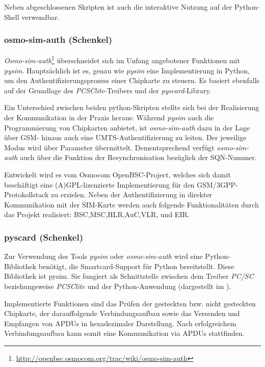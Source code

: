 Neben abgeschlossenen Skripten ist auch die interaktive Nutzung auf der
Python-Shell verwendbar.

\subsubsection{osmo-sim-auth (Schenkel)}
\label{subsec:osmosim}
\textit{Osmo-sim-auth}\footnote{\url{http://openbsc.osmocom.org/trac/wiki/osmo-sim-auth}}
überschneidet sich im Unfang angebotener Funktionen mit \textit{pysim}. Hauptsächlich ist es,
genau wie \textit{pysim} eine Implementierung in Python, um den Authentifizierungsprozess
einer Chipkarte zu steuern. Es basiert ebenfalls auf der Grundlage des
\textit{PCSClite}-Treibers und der \textit{pyscard}-Library.

Ein Unterschied zwischen beiden python-Skripten stellte sich bei der
Realisierung der Kommunikation in der Praxis heraus:
Während \textit{pysim} auch die Programmierung von Chipkarten anbietet, ist
\textit{osmo-sim-auth} dazu in der Lage über \ac{GSM}- hinaus auch
eine \ac{UMTS}-Authentifizierung zu leiten.
Der jeweilige Modus wird über Parameter übermittelt.
Dementsprechend verfügt \textit{osmo-sim-auth} auch über die Funktion der
Resynchronisation bezüglich der \ac{SQN}-Nummer\cite{osmosimweb}.

Entwickelt wird es vom Osmocom OpenBSC-Project, welches sich damit
beschäftigt eine (A)GPL-lizenzierte Implementierung für den
GSM/3GPP-Protokollstack zu erzielen. Neben der Authentifizierung
in direkter Kommunikation mit der SIM-Karte werden auch folgende
Funktionalitäten durch das Projekt realisiert:
\ac{BSC},\ac{MSC},\ac{HLR},\ac{AuC},\ac{VLR}, und \ac{EIR}\cite{osmocombscweb}.

\subsubsection{pyscard (Schenkel)}
\label{pyscard}
Zur Verwendung des Tools \textit{pysim} oder \textit{osmo-sim-auth} wird eine Python-Bibliothek benötigt,
die Smartcard-Support für Python bereitstellt. Diese Bibliothek
ist pysim. Sie fungiert als Schnittstelle zwischen dem Treiber \textit{PC/SC}
beziehungsweise \textit{PCSClite} und der Python-Anwendung 
(dargestellt im ).

Implementierte Funktionen sind das Prüfen der gesteckten bzw. nicht gesteckten
Chipkarte, der darauffolgende Verbindungsaufbau sowie das Versenden und
Empfangen von APDUs in hexadezimaler Darstellung.
Nach erfolgreichem Verbindungsaufbau kann somit eine Kommunikation via
APDUs stattfinden.

